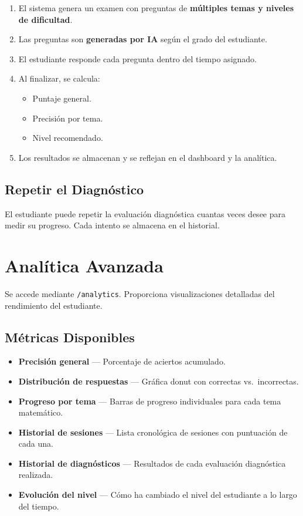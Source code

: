 \documentclass[12pt, a4paper, oneside]{book}
\begin{document}
\begin{stepbox}[title={Flujo de diagnóstico}]
\begin{enumerate}
    \item El sistema genera un examen con preguntas de \textbf{múltiples temas y niveles de dificultad}.
    \item Las preguntas son \textbf{generadas por IA} según el grado del estudiante.
    \item El estudiante responde cada pregunta dentro del tiempo asignado.
    \item Al finalizar, se calcula:
    \begin{itemize}
        \item Puntaje general.
        \item Precisión por tema.
        \item Nivel recomendado.
    \end{itemize}
    \item Los resultados se almacenan y se reflejan en el dashboard y la analítica.
\end{enumerate}
\end{stepbox}

\section{Repetir el Diagnóstico}

El estudiante puede repetir la evaluación diagnóstica cuantas veces desee para medir su progreso. Cada intento se almacena en el historial.


\chapter{Analítica Avanzada}

Se accede mediante \texttt{/analytics}. Proporciona visualizaciones detalladas del rendimiento del estudiante.

\section{Métricas Disponibles}

\begin{itemize}
    \item \textbf{Precisión general} — Porcentaje de aciertos acumulado.
    \item \textbf{Distribución de respuestas} — Gráfica donut con correctas vs.\ incorrectas.
    \item \textbf{Progreso por tema} — Barras de progreso individuales para cada tema matemático.
    \item \textbf{Historial de sesiones} — Lista cronológica de sesiones con puntuación de cada una.
    \item \textbf{Historial de diagnósticos} — Resultados de cada evaluación diagnóstica realizada.
    \item \textbf{Evolución del nivel} — Cómo ha cambiado el nivel del estudiante a lo largo del tiempo.
\end{itemize}
\end{document}
